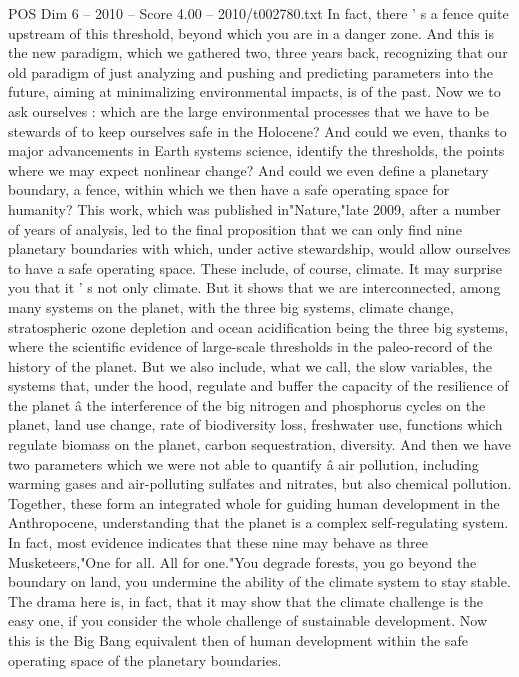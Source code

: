 \begin{textsample}{POS Dim 6 – 2010 – Score 4.00 – 2010/t002780.txt}
In fact, there ' s a fence quite upstream of this threshold, beyond which you are in a danger zone.
And this is the new paradigm, which we gathered two, three years back, recognizing that our old paradigm of just analyzing and pushing and predicting parameters into the future, aiming at minimalizing environmental impacts, is of the past.
Now we to ask ourselves : which are the large environmental processes that we have to be stewards of to keep ourselves safe in the Holocene?
And could we even, thanks to major advancements in Earth systems science, identify the thresholds, the points where we may expect nonlinear change?
And could we even define a planetary boundary, a fence, within which we then have a safe operating space for humanity?
This work, which was published in"Nature,"late 2009, after a number of years of analysis, led to the final proposition that we can only find nine planetary boundaries with which, under active stewardship, would allow ourselves to have a safe operating space.
These include, of course, climate.
It may surprise you that it ' s not only climate.
But it shows that we are interconnected, among many systems on the planet, with the three big systems, climate change, stratospheric ozone depletion and ocean acidification being the three big systems, where the scientific evidence of large-scale thresholds in the paleo-record of the history of the planet.
But we also include, what we call, the slow variables, the systems that, under the hood, regulate and buffer the capacity of the resilience of the planet â the interference of the big nitrogen and phosphorus cycles on the planet, land use change, rate of biodiversity loss, freshwater use, functions which regulate biomass on the planet, carbon sequestration, diversity.
And then we have two parameters which we were not able to quantify â air pollution, including warming gases and air-polluting sulfates and nitrates, but also chemical pollution.
Together, these form an integrated whole for guiding human development in the Anthropocene, understanding that the planet is a complex self-regulating system.
In fact, most evidence indicates that these nine may behave as three Musketeers,"One for all.
All for one."You degrade forests, you go beyond the boundary on land, you undermine the ability of the climate system to stay stable.
The drama here is, in fact, that it may show that the climate challenge is the easy one, if you consider the whole challenge of sustainable development.
Now this is the Big Bang equivalent then of human development within the safe operating space of the planetary boundaries.

\end{textsample}
